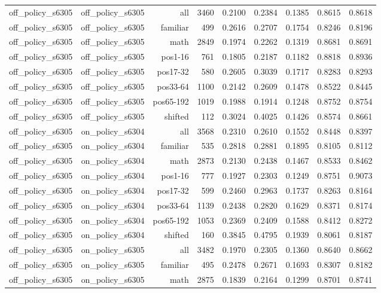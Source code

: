 \begin{tabular}{lrrrrrrrr}
off\_policy\_s6305 & off\_policy\_s6305 & all & 3460 & 0.2100 & 0.2384 & 0.1385 & 0.8615 & 0.8618 \\
off\_policy\_s6305 & off\_policy\_s6305 & familiar & 499 & 0.2616 & 0.2707 & 0.1754 & 0.8246 & 0.8196 \\
off\_policy\_s6305 & off\_policy\_s6305 & math & 2849 & 0.1974 & 0.2262 & 0.1319 & 0.8681 & 0.8691 \\
off\_policy\_s6305 & off\_policy\_s6305 & pos1-16 & 761 & 0.1805 & 0.2187 & 0.1182 & 0.8818 & 0.8936 \\
off\_policy\_s6305 & off\_policy\_s6305 & pos17-32 & 580 & 0.2605 & 0.3039 & 0.1717 & 0.8283 & 0.8293 \\
off\_policy\_s6305 & off\_policy\_s6305 & pos33-64 & 1100 & 0.2142 & 0.2609 & 0.1478 & 0.8522 & 0.8445 \\
off\_policy\_s6305 & off\_policy\_s6305 & pos65-192 & 1019 & 0.1988 & 0.1914 & 0.1248 & 0.8752 & 0.8754 \\
off\_policy\_s6305 & off\_policy\_s6305 & shifted & 112 & 0.3024 & 0.4025 & 0.1426 & 0.8574 & 0.8661 \\
off\_policy\_s6305 & on\_policy\_s6304 & all & 3568 & 0.2310 & 0.2610 & 0.1552 & 0.8448 & 0.8397 \\
off\_policy\_s6305 & on\_policy\_s6304 & familiar & 535 & 0.2818 & 0.2881 & 0.1895 & 0.8105 & 0.8112 \\
off\_policy\_s6305 & on\_policy\_s6304 & math & 2873 & 0.2130 & 0.2438 & 0.1467 & 0.8533 & 0.8462 \\
off\_policy\_s6305 & on\_policy\_s6304 & pos1-16 & 777 & 0.1927 & 0.2303 & 0.1249 & 0.8751 & 0.9073 \\
off\_policy\_s6305 & on\_policy\_s6304 & pos17-32 & 599 & 0.2460 & 0.2963 & 0.1737 & 0.8263 & 0.8164 \\
off\_policy\_s6305 & on\_policy\_s6304 & pos33-64 & 1139 & 0.2438 & 0.2820 & 0.1629 & 0.8371 & 0.8174 \\
off\_policy\_s6305 & on\_policy\_s6304 & pos65-192 & 1053 & 0.2369 & 0.2409 & 0.1588 & 0.8412 & 0.8272 \\
off\_policy\_s6305 & on\_policy\_s6304 & shifted & 160 & 0.3845 & 0.4795 & 0.1939 & 0.8061 & 0.8187 \\
off\_policy\_s6305 & on\_policy\_s6305 & all & 3482 & 0.1970 & 0.2305 & 0.1360 & 0.8640 & 0.8662 \\
off\_policy\_s6305 & on\_policy\_s6305 & familiar & 495 & 0.2478 & 0.2671 & 0.1693 & 0.8307 & 0.8182 \\
off\_policy\_s6305 & on\_policy\_s6305 & math & 2875 & 0.1839 & 0.2164 & 0.1299 & 0.8701 & 0.8741 \\

\end{tabular}
